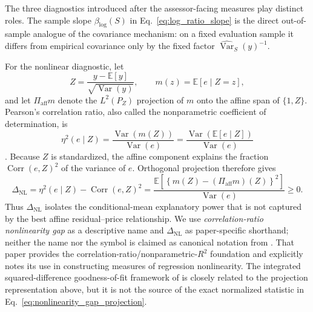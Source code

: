 \documentclass[10pt]{article}
\theoremstyle{definition}
\newcommand{\E}{\mathbb{E}}
\newcommand{\Corr}{\operatorname{Corr}}
\newcommand{\Var}{\operatorname{Var}}
\newcommand{\1}{\mathbf{1}}
\begin{document}
The three diagnostics introduced after the assessor-facing measures play distinct
roles. The sample slope $\beta_{\log}(S)$ in Eq.~\eqref{eq:log_ratio_slope} is the
direct out-of-sample analogue of the covariance mechanism: on a fixed evaluation
sample it differs from empirical covariance only by the fixed factor
$\widehat{\Var}_S(y)^{-1}$.

For the nonlinear diagnostic, let
\[
Z=\frac{y-\E[y]}{\sqrt{\Var(y)}},
\qquad
m(z)=\E[e\mid Z=z],
\]
and let $\Pi_{\mathrm{aff}}m$ denote the $L^2(P_Z)$ projection of $m$ onto the
affine span of $\{1,Z\}$. Pearson's correlation ratio, also called the
nonparametric coefficient of determination, is
\[
\eta^2(e\mid Z)
=
\frac{\Var\!\left(m(Z)\right)}{\Var(e)}
=
\frac{\Var\!\left(\E[e\mid Z]\right)}{\Var(e)}
\]
\cite{DoksumSamarov1995}. Because $Z$ is standardized, the affine component explains
the fraction $\Corr(e,Z)^2$ of the variance of $e$. Orthogonal projection therefore
gives
\begin{equation}
\label{eq:nonlinearity_gap_projection}
\Delta_{\mathrm{NL}}
=
\eta^2(e\mid Z)-\Corr(e,Z)^2
=
\frac{
\E\!\left[
\left\{
m(Z)-(\Pi_{\mathrm{aff}}m)(Z)
\right\}^2
\right]
}{
\Var(e)
}
\geq 0.
\end{equation}
Thus $\Delta_{\mathrm{NL}}$ isolates the conditional-mean explanatory power that is
not captured by the best affine residual--price relationship. We use
\emph{correlation-ratio nonlinearity gap} as a descriptive name and
$\Delta_{\mathrm{NL}}$ as paper-specific shorthand; neither the name nor the symbol
is claimed as canonical notation from \textcite{DoksumSamarov1995}. That paper
provides the correlation-ratio/nonparametric-$R^2$ foundation and explicitly notes
its use in constructing measures of regression nonlinearity. The integrated
squared-difference goodness-of-fit framework of \textcite{HardleMammen1993} is
closely related to the projection representation above, but it is not the source of
the exact normalized statistic in Eq.~\eqref{eq:nonlinearity_gap_projection}.
\end{document}

